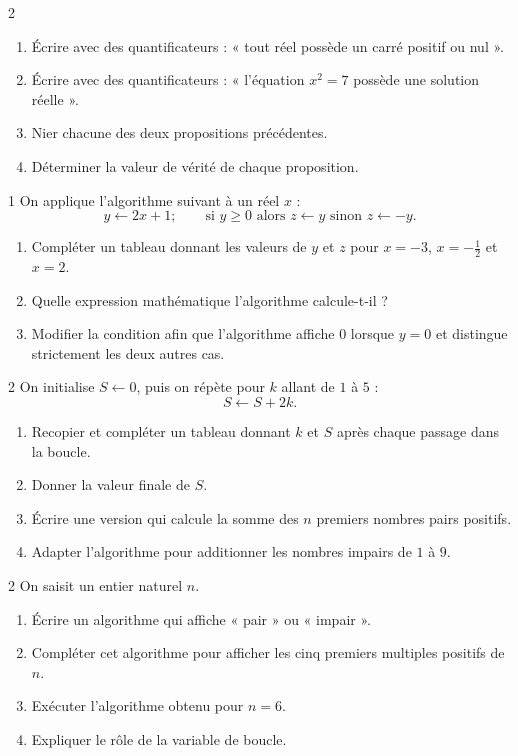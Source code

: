 \begin{exo}{2}
\begin{enumerate}
  \item Écrire avec des quantificateurs : « tout réel possède un carré
  positif ou nul ».
  \item Écrire avec des quantificateurs : « l'équation $x^2=7$ possède
  une solution réelle ».
  \item Nier chacune des deux propositions précédentes.
  \item Déterminer la valeur de vérité de chaque proposition.
\end{enumerate}
\end{exo}

\begin{exo}{1}
On applique l'algorithme suivant à un réel $x$ :
\[
  y\leftarrow 2x+1;\qquad
  \text{si }y\geq0\text{ alors }z\leftarrow y
  \text{ sinon }z\leftarrow-y.
\]
\begin{enumerate}
  \item Compléter un tableau donnant les valeurs de $y$ et $z$ pour
  $x=-3$, $x=-\frac12$ et $x=2$.
  \item Quelle expression mathématique l'algorithme calcule-t-il ?
  \item Modifier la condition afin que l'algorithme affiche $0$ lorsque
  $y=0$ et distingue strictement les deux autres cas.
\end{enumerate}
\end{exo}

\begin{exo}{2}
On initialise $S\leftarrow0$, puis on répète pour $k$ allant de $1$ à $5$ :
\[
  S\leftarrow S+2k.
\]
\begin{enumerate}
  \item Recopier et compléter un tableau donnant $k$ et $S$ après chaque
  passage dans la boucle.
  \item Donner la valeur finale de $S$.
  \item Écrire une version qui calcule la somme des $n$ premiers nombres
  pairs positifs.
  \item Adapter l'algorithme pour additionner les nombres impairs de $1$ à $9$.
\end{enumerate}
\end{exo}

\begin{exo}{2}
On saisit un entier naturel $n$.
\begin{enumerate}
  \item Écrire un algorithme qui affiche « pair » ou « impair ».
  \item Compléter cet algorithme pour afficher les cinq premiers multiples
  positifs de $n$.
  \item Exécuter l'algorithme obtenu pour $n=6$.
  \item Expliquer le rôle de la variable de boucle.
\end{enumerate}
\end{exo}

